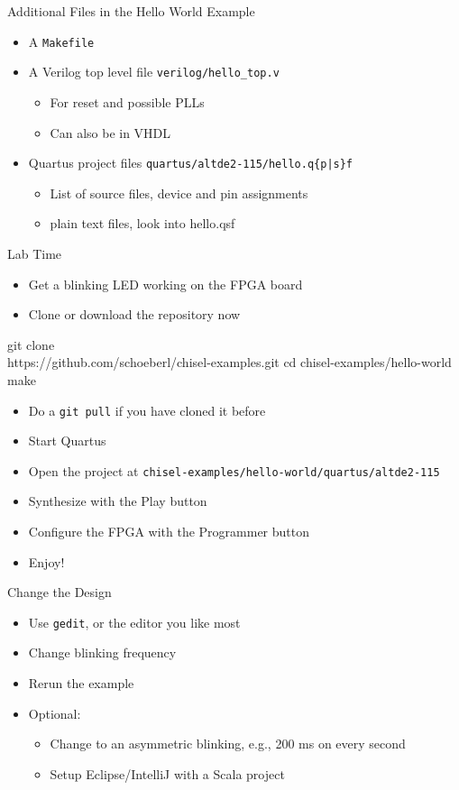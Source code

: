 \documentclass[xcolor=pdflatex,dvipsnames,table]{beamer}
\newcommand{\code}[1]{{\texttt{#1}}}
\begin{document}
\begin{frame}[fragile]{Additional Files in the Hello World Example}
\begin{itemize}
\item A \code{Makefile}
\item A Verilog top level file \code{verilog/hello\_top.v}
\begin{itemize}
\item For reset and possible PLLs
\item Can also be in VHDL
\end{itemize}
\item Quartus project files \code{quartus/altde2-115/hello.q\{p|s\}f}
\begin{itemize}
\item List of source files, device and pin assignments
\item plain text files, look into hello.qsf
\end{itemize}
\end{itemize}
\end{frame}

\begin{frame}[fragile]{Lab Time}
\begin{itemize}
\item Get a blinking LED working on the FPGA board
\item Clone or download the repository now
\end{itemize}
\begin{chisel}
git clone \\
   https://github.com/schoeberl/chisel-examples.git
cd chisel-examples/hello-world
make
\end{chisel}
\begin{itemize}
\item Do a \code{git pull} if you have cloned it before
\item Start Quartus
\item Open the project at \code{chisel-examples/hello-world/quartus/altde2-115}
\item Synthesize with the Play button
\item Configure the FPGA with the Programmer button
\item Enjoy!
\end{itemize}
\end{frame}

\begin{frame}[fragile]{Change the Design}
\begin{itemize}
\item Use \code{gedit}, or the editor you like most
\item Change blinking frequency
\item Rerun the example
\item Optional:
\begin{itemize}
\item Change to an asymmetric blinking, e.g., 200 ms on every second 
\item Setup Eclipse/IntelliJ with a Scala project 
\end{itemize}
\end{itemize}
\end{frame}
\end{document}
